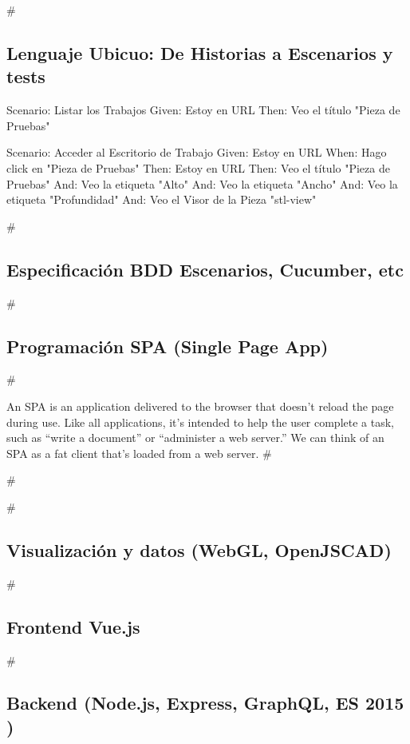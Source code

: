 #\subsection{Lenguaje Ubicuo: De Historias a Escenarios y tests}

Scenario: Listar los Trabajos\vskip0mm
  Given: Estoy en URL\vskip0mm
  Then: Veo el título "Pieza de Pruebas"\vskip10mm
 
Scenario: Acceder al Escritorio de Trabajo\vskip0mm
  Given: Estoy en URL\vskip0mm
  When: Hago click en "Pieza de Pruebas"\vskip0mm
  Then: Estoy en URL\vskip0mm
  Then: Veo el título "Pieza de Pruebas"\vskip0mm
  And: Veo la etiqueta "Alto"\vskip0mm
  And: Veo la etiqueta "Ancho"\vskip0mm
  And: Veo la etiqueta "Profundidad"\vskip0mm
  And: Veo el Visor de la Pieza "stl-view"
  
#\subsection{Especificación BDD Escenarios, Cucumber, etc}

#\subsection{Programación SPA (Single Page App)}

#\begin{displayquote}
An SPA is an application delivered to the browser that doesn’t reload the page during use. Like all applications, it’s intended to help the user complete a task, such as “write a document” or “administer a web server.” We can think of an SPA as a fat client that’s loaded from a web server. \cite{Mikowski2015}
#\end{displayquote}

#


#\subsection{Visualización y datos (WebGL, OpenJSCAD)}

#\subsection{Frontend Vue.js}

#\subsection{Backend (Node.js, Express, GraphQL, ES 2015 )}


